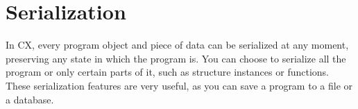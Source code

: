 \documentclass[11pt,fleqn,openany]{book} %
\begin{document}



\chapter{Serialization}
\label{chapter:serialization}


In CX, every program object and piece of data can be serialized at any moment, preserving any state in which the program is. You can choose to serialize all the program or only certain parts of it, such as structure instances or functions. These serialization features are very useful, as you can save a program to a file or a database.
\end{document}
